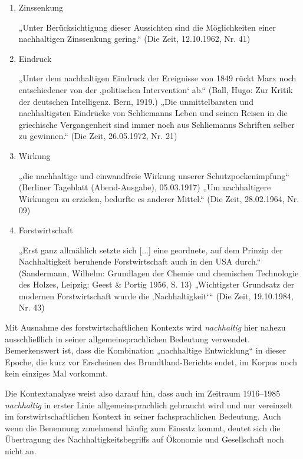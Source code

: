 \documentclass[
    german,
    a4paper,%
    12pt,%
    oneside,%
    toc=bibliography,
    final,
]{scrartcl}
\begin{document}
\begin{enumerate}
\item Zinssenkung
	\begin{exe}
	\ex \label{ex:epoche3-koll-1} „Unter Berücksichtigung dieser Aussichten sind die Möglichkeiten einer nachhaltigen Zinssenkung gering.“ (Die Zeit, 12.10.1962, Nr. 41)
	\end{exe}
\item Eindruck
	\begin{exe}
	\ex „Unter dem nachhaltigen Eindruck der Ereignisse von 1849 rückt Marx noch entschiedener von der ‚politischen Intervention‘ ab.“ (Ball, Hugo: Zur Kritik der deutschen Intelligenz. Bern, 1919.)
	\ex „Die unmittelbarsten und nachhaltigsten Eindrücke von Schliemanns Leben und seinen Reisen in die griechische Vergangenheit sind immer noch aus Schliemanns Schriften selber zu gewinnen.“ (Die Zeit, 26.05.1972, Nr. 21)
	\end{exe}
\item Wirkung
	\begin{exe}
	\ex „die nachhaltige und einwandfreie Wirkung unserer Schutzpockenimpfung“ (Berliner Tageblatt (Abend-Ausgabe), 05.03.1917)
	\ex „Um nachhaltigere Wirkungen zu erzielen, bedurfte es anderer Mittel.“ (Die Zeit, 28.02.1964, Nr. 09)
	\end{exe}
\item Forstwirtschaft
	\begin{exe}
	\ex „Erst ganz allmählich setzte sich [...] eine geordnete, auf dem Prinzip der Nachhaltigkeit beruhende Forstwirtschaft auch in den USA durch.“ (Sandermann, Wilhelm: Grundlagen der Chemie und chemischen Technologie des Holzes, Leipzig: Geest \& Portig 1956, S. 13)
	\ex \label{ex:epoche3-koll-n} „Wichtigster Grundsatz der modernen Forstwirtschaft wurde die ‚Nachhaltigkeit‘“ (Die Zeit, 19.10.1984, Nr. 43)
	\end{exe}
\end{enumerate}

Mit Ausnahme des forstwirtschaftlichen Kontexts wird \textit{nachhaltig} hier nahezu ausschließlich in seiner allgemeinsprachlichen Bedeutung verwendet. Bemerkenswert ist, dass die Kombination „nachhaltige Entwicklung“ in dieser Epoche, die kurz vor Erscheinen des Brundtland-Berichts endet, im Korpus noch kein einziges Mal vorkommt.

Die Kontextanalyse weist also darauf hin, dass auch im Zeitraum 1916–1985 \textit{nachhaltig} in erster Linie allgemeinsprachlich gebraucht wird und nur vereinzelt im forstwirtschaftlichen Kontext in seiner fachsprachlichen Bedeutung. Auch wenn die Benennung zunehmend häufig zum Einsatz kommt, deutet sich die Übertragung des Nachhaltigkeitsbegriffs auf Ökonomie und Gesellschaft noch nicht an.
\end{document}
